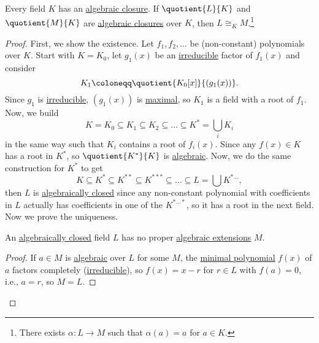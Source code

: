 \begin{theorem}\label{thm:algebraic-closures-isomorphism}
	Every field \(K\) has an \hyperref[def:algebraic-closure]{algebraic closure}. If \(\quotient{L}{K} \) and \(\quotient{M}{K} \) are \hyperref[def:algebraic-closure]{algebraic closures} over \(K\), then \(L \cong _{K} M\).\footnote{There exists \(\alpha \colon L \to M\) such that \(\alpha (a) = a\) for \(a\in K\).}
\end{theorem}
\begin{proof}
	First, we show the existence. Let \(f_1, f_2, \ldots \) be (non-constant) polynomials over \(K\). Start with \(K = K_0\), let \(g_1(x)\) be an \hyperref[prev:irreducible]{irreducible} factor of \(f_1(x)\) and consider
	\[
		K_1 \coloneqq \quotient{K_0[x]}{(g_1(x))}.
	\]
	Since \(g_1\) is \hyperref[prev:irreducible]{irreducible}, \((g_1(x))\) is \hyperref[def:proper-ideal-maximal]{maximal}, so \(K_1\) is a field with a root of \(f_1\). Now, we build
	\[
		K = K_0 \subseteq K_1 \subseteq K_2 \subseteq \ldots \subseteq K^{\ast} = \bigcup_{i} K_i
	\]
	in the same way such that \(K_i\) contains a root of \(f_i(x)\). Since any \(f(x)\in K\) has a root in \(K^{\ast} \), so \(\quotient{K^{\ast} }{K} \) is \hyperref[def:algebraic-extension]{algebraic}.
	Now, we do the same construction for \(K^{\ast} \) to get
	\[
		K\subseteq K^{\ast} \subseteq K^{\ast\ast } \subseteq K^{\ast\ast \ast } \subseteq \ldots \subseteq L = \bigcup K^{\ast \ldots },
	\]
	then \(L\) is \hyperref[def:algebraically-closed]{algebraically closed} since any non-constant polynomial with coefficients in \(L\) actually has coefficients in one of the \(K^{\ast\ldots \ast} \), so it has a root in the next field. Now we prove the uniqueness.

	\begin{lemma}\label{lma:lec11-1}
		An \hyperref[def:algebraically-closed]{algebraically closed} field \(L\) has no proper \hyperref[def:algebraic-extension]{algebraic extensions} \(M\).
	\end{lemma}
	\begin{proof}
		If \(a\in M\) is \hyperref[def:algebraic]{algebraic} over \(L\) for some \(M\), the \hyperref[def:minimal-polynomial]{minimal polynomial} \(f(x)\) of \(a\) factors completely (\hyperref[prev:irreducible]{irreducible}), so \(f(x) = x-r\) for \(r\in L\) with \(f(a) = 0\), i.e., \(a = r\), so \(M = L\).
	\end{proof}


\end{proof}

